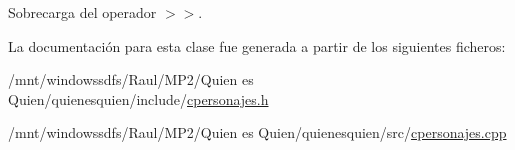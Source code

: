 Sobrecarga del operador $>$$>$. 



La documentación para esta clase fue generada a partir de los siguientes ficheros:\begin{CompactItemize}
\item 
/mnt/windowssdfs/Raul/MP2/Quien es Quien/quienesquien/include/\hyperlink{cpersonajes_8h}{cpersonajes.h}\item 
/mnt/windowssdfs/Raul/MP2/Quien es Quien/quienesquien/src/\hyperlink{cpersonajes_8cpp}{cpersonajes.cpp}\end{CompactItemize}
